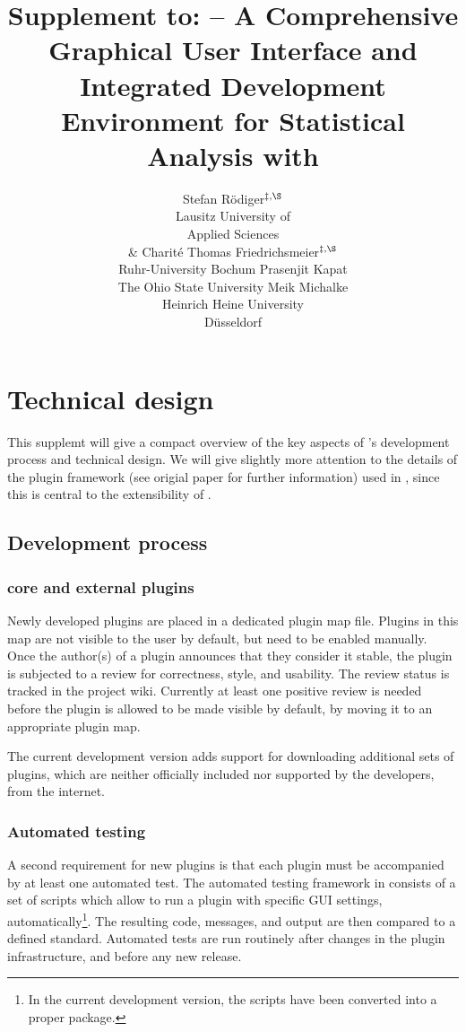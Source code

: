 \documentclass[article,shortnames]{jss}
\author{Stefan R\"odiger$^{\ddag,\S}$\\Lausitz University of\\Applied Sciences\\ \& Charit\'e
	\And Thomas Friedrichsmeier$^{\ddag,\S}$\\Ruhr-University Bochum
	\AND Prasenjit Kapat\\The Ohio State University
	\And Meik Michalke\\Heinrich Heine University\\D\"usseldorf
}
\title{Supplement to:\linebreak 
  \pkg{RKWard} -- A Comprehensive Graphical User Interface and Integrated Development Environment for Statistical Analysis with \proglang{R}}
\begin{document}
\newpage 
\section{Technical design}
\label{sec:technical}
This supplemt will give a compact overview of the key aspects of 's
development process and technical design. We will give slightly more attention to the details of the
plugin framework (see origial paper for further information) used in , since this is central to the extensibility of
.

\subsection{Development process}
\subsubsection[RKWard core and external plugins]{ core and external plugins}
\label{sec:technical_processes_plugins}
Newly developed plugins are placed in a dedicated plugin map file.
Plugins in this map are not visible to the user by
default, but need to be enabled manually. Once the author(s) of a plugin
announces that they consider it stable, the plugin is subjected to a review for
correctness, style, and usability. The review status is tracked in the project
wiki. Currently at least one positive review is needed before the plugin is
allowed to be made visible by default, by moving it to an appropriate plugin
map.

The current development version adds support for downloading additional sets of
plugins, which are neither officially included nor supported by the
 developers, from the internet.

\subsubsection{Automated testing}
\label{sec:technical_processes_automatedtesting}
A second requirement for new plugins is that each plugin must be accompanied by
at least one automated test. The automated testing framework in  consists
of a set of  scripts which allow to run a plugin with specific GUI settings,
automatically\footnote{
  In the current development version, the scripts have been converted into a proper
   package.
}. The resulting  code,  messages, and output are then compared
to a defined standard. Automated tests are run routinely after changes in the
plugin infrastructure, and before any new release.
\end{document}

